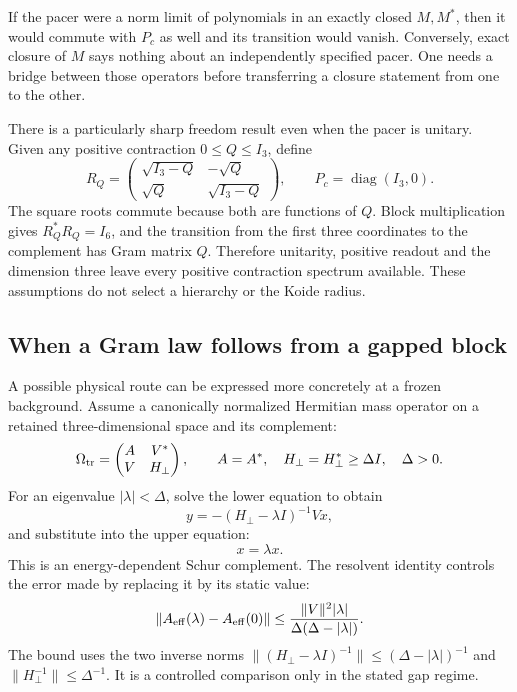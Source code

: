 If the pacer were a norm limit of polynomials in an exactly closed
$M,M^*$, then it would commute with $P_c$ as well and its transition
would vanish. Conversely, exact closure of $M$ says nothing about
an independently specified pacer. One needs a bridge between those
operators before transferring a closure statement from one to the other.

There is a particularly sharp freedom result even when the pacer is
unitary. Given any positive contraction $0\leq Q\leq I_3$, define
\begin{equation}
 R_Q=\begin{pmatrix}\sqrt{I_3-Q}&-\sqrt Q\\
                         \sqrt Q&\sqrt{I_3-Q}\end{pmatrix},\qquad
 P_c=\operatorname{diag}(I_3,0).
\end{equation}
The square roots commute because both are functions of $Q$.
Block multiplication gives $R_Q^*R_Q=I_6$, and the transition from
the first three coordinates to the complement has Gram matrix $Q$.
Therefore unitarity, positive readout and the dimension three leave
every positive contraction spectrum available. These assumptions
do not select a hierarchy or the Koide radius.

\subsection{When a Gram law follows from a gapped block}
A possible physical route can be expressed more concretely at a
frozen background. Assume a canonically normalized Hermitian mass
operator on a retained three-dimensional space and its complement:
\begin{equation}
 \Omega_{\rm tr}=\begin{pmatrix}A&V^*\\V&H_\perp\end{pmatrix},
 \qquad A=A^*,\quad H_\perp=H_\perp^*\geq\Delta I,
 \quad \Delta>0.
\end{equation}
For an eigenvalue $|\lambda|<\Delta$, solve the lower equation to obtain
\begin{equation}
 y=-(H_\perp-\lambda I)^{-1}Vx,
\end{equation}
and substitute into the upper equation:
\begin{equation}
 [A-V^*(H_\perp-\lambda I)^{-1}V]x=\lambda x.
\end{equation}
This is an energy-dependent Schur complement. The resolvent identity
controls the error made by replacing it by its static value:
\begin{equation}
 \|A_{\rm eff}(\lambda)-A_{\rm eff}(0)\|
 \leq\frac{\|V\|^2|\lambda|}{\Delta(\Delta-|\lambda|)}.
\end{equation}
The bound uses the two inverse norms
$\|(H_\perp-\lambda I)^{-1}\|\leq(\Delta-|\lambda|)^{-1}$
and $\|H_\perp^{-1}\|\leq\Delta^{-1}$. It is a controlled
comparison only in the stated gap regime.

